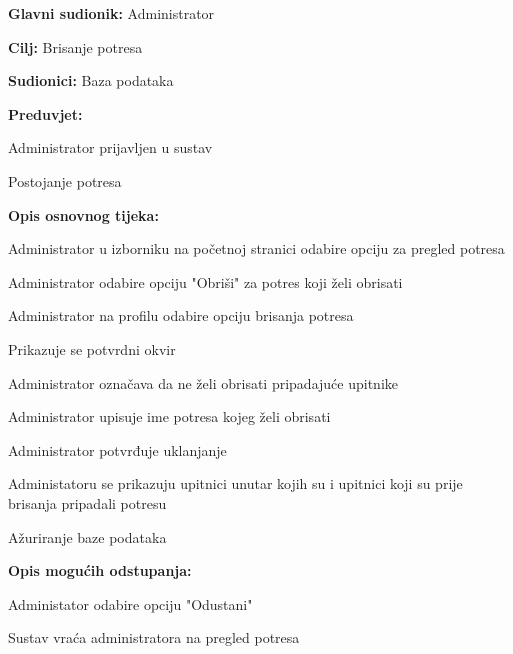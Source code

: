 			\noindent {}
			\begin{packed_item}

				\item \textbf{Glavni sudionik:} Administrator
				\item \textbf{Cilj:} Brisanje potresa
				\item \textbf{Sudionici:} Baza podataka
				\item \textbf{Preduvjet:}
					\begin{packed_item}
						\item Administrator prijavljen u sustav
						\item Postojanje potresa
					\end{packed_item}
				\item \textbf{Opis osnovnog tijeka:}
				
				\item[] \begin{packed_enum}

					\item Administrator u izborniku na početnoj stranici odabire opciju za pregled potresa
					\item Administrator odabire opciju "Obriši" za potres koji želi obrisati
					\item Administrator na profilu odabire opciju brisanja potresa
					\item Prikazuje se potvrdni okvir
					\item Administrator označava da ne želi obrisati pripadajuće upitnike
					\item Administrator upisuje ime potresa kojeg želi obrisati
					\item Administrator potvrđuje uklanjanje
					\item Administatoru se prikazuju upitnici unutar kojih su i upitnici koji su prije brisanja pripadali potresu
					\item Ažuriranje baze podataka
					
				\end{packed_enum}
				
				\item  \textbf{Opis mogućih odstupanja:}
				
				\item[] \begin{packed_item}
				 
					\item[7.a] Administator odabire opciju "Odustani"
					\item[] \begin{packed_enum}
						
						\item Sustav vraća administratora na pregled potresa
						
						\end{packed_enum}
					
				\end{packed_item}

			\end{packed_item}

